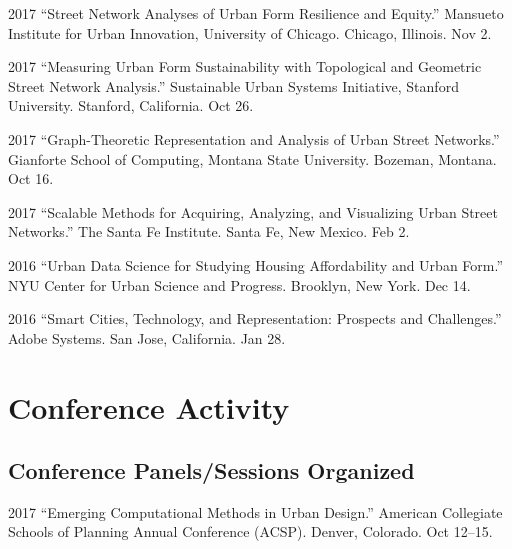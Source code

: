 \documentclass{academiccv}
\begin{document}
\begin{tablist}

\item[2017] \tab \enquote{Street Network Analyses of Urban Form Resilience and Equity.} Mansueto Institute for Urban Innovation, University of Chicago. Chicago, Illinois. Nov 2.

\item[2017] \tab \enquote{Measuring Urban Form Sustainability with Topological and Geometric Street Network Analysis.} Sustainable Urban Systems Initiative, Stanford University. Stanford, California. Oct 26.

\item[2017] \tab \enquote{Graph-Theoretic Representation and Analysis of Urban Street Networks.} Gianforte School of Computing, Montana State University. Bozeman, Montana. Oct 16.

\item[2017] \tab \enquote{Scalable Methods for Acquiring, Analyzing, and Visualizing Urban Street Networks.} The Santa Fe Institute. Santa Fe, New Mexico. Feb 2.

\item[2016] \tab \enquote{Urban Data Science for Studying Housing Affordability and Urban Form.} NYU Center for Urban Science and Progress. Brooklyn, New York. Dec 14.

\item[2016] \tab \enquote{Smart Cities, Technology, and Representation: Prospects and Challenges.} Adobe Systems. San Jose, California. Jan 28.

\end{tablist}



\section*{Conference Activity}

\subsection*{Conference Panels/Sessions Organized}

\begin{tablist}
	
	\item[2017] \tab \enquote{Emerging Computational Methods in Urban Design.} American Collegiate Schools of Planning Annual Conference (ACSP). Denver, Colorado. Oct 12--15.
	
\end{tablist}
\end{document}
